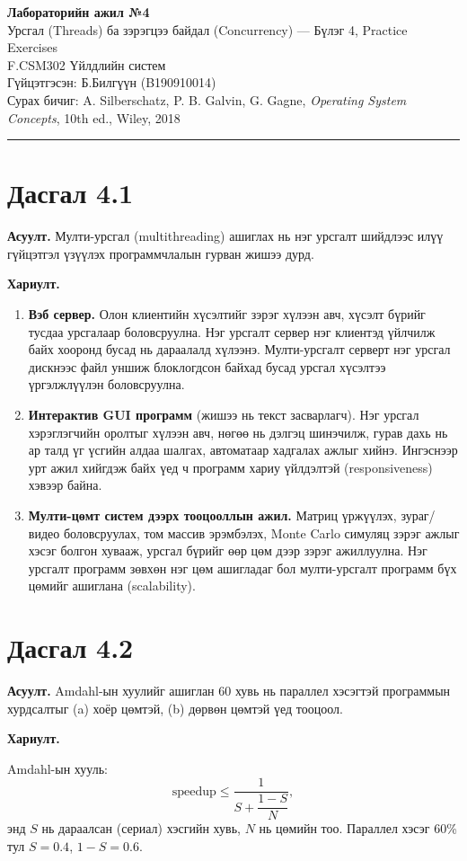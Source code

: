 \documentclass[12pt,a4paper]{article}
\newcommand{\question}[2]{\section{Дасгал #1}\textbf{Асуулт.} #2\par\medskip\textbf{Хариулт.}\par}
\begin{document}
\begin{center}
  {\Large\bfseries Лабораторийн ажил №4}\\[0.4em]
  {\large Урсгал (Threads) ба зэрэгцээ байдал (Concurrency) — Бүлэг 4, Practice Exercises}\\[0.8em]
  F.CSM302 Үйлдлийн систем\\
  Гүйцэтгэсэн: Б.Билгүүн (B190910014)\\[0.3em]
  Сурах бичиг: A. Silberschatz, P. B. Galvin, G. Gagne, \textit{Operating System Concepts}, 10th ed., Wiley, 2018
\end{center}
\hrule
\bigskip

\question{4.1}{Мулти-урсгал (multithreading) ашиглах нь нэг урсгалт шийдлээс илүү гүйцэтгэл үзүүлэх программчлалын гурван жишээ дурд.}

\begin{enumerate}[leftmargin=1.5em]
  \item \textbf{Вэб сервер.} Олон клиентийн хүсэлтийг зэрэг хүлээн авч, хүсэлт бүрийг тусдаа урсгалаар боловсруулна. Нэг урсгалт сервер нэг клиентэд үйлчилж байх хооронд бусад нь дараалалд хүлээнэ. Мулти-урсгалт серверт нэг урсгал дискнээс файл уншиж блоклогдсон байхад бусад урсгал хүсэлтээ үргэлжлүүлэн боловсруулна.
  \item \textbf{Интерактив GUI программ} (жишээ нь текст засварлагч). Нэг урсгал хэрэглэгчийн оролтыг хүлээн авч, нөгөө нь дэлгэц шинэчилж, гурав дахь нь ар талд үг үсгийн алдаа шалгах, автоматаар хадгалах ажлыг хийнэ. Ингэснээр урт ажил хийгдэж байх үед ч программ хариу үйлдэлтэй (responsiveness) хэвээр байна.
  \item \textbf{Мулти-цөмт систем дээрх тооцооллын ажил.} Матриц үржүүлэх, зураг/видео боловсруулах, том массив эрэмбэлэх, Monte Carlo симуляц зэрэг ажлыг хэсэг болгон хувааж, урсгал бүрийг өөр цөм дээр зэрэг ажиллуулна. Нэг урсгалт программ зөвхөн нэг цөм ашигладаг бол мулти-урсгалт программ бүх цөмийг ашиглана (scalability).
\end{enumerate}

\question{4.2}{Amdahl-ын хуулийг ашиглан 60 хувь нь параллел хэсэгтэй программын хурдсалтыг (a) хоёр цөмтэй, (b) дөрвөн цөмтэй үед тооцоол.}

Amdahl-ын хууль:
\[
  \text{speedup} \le \frac{1}{S + \dfrac{1-S}{N}},
\]
энд $S$ нь дараалсан (сериал) хэсгийн хувь, $N$ нь цөмийн тоо. Параллел хэсэг 60\% тул $S = 0.4$, $1-S = 0.6$.
\end{document}
